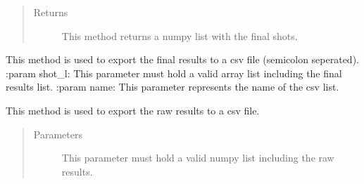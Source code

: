 \documentclass[letterpaper,10pt,english,openany,oneside]{sphinxmanual}
\begin{document}
\begin{fulllineitems}
\begin{fulllineitems}
\begin{quote}
\begin{description}
\item[{Returns}] \leavevmode
This method returns a numpy list with the final shots.

\end{description}\end{quote}

\end{fulllineitems}


\begin{fulllineitems}
\label{\detokenize{SBD:sbd.SBD.SBD.exportFinalResultsToCsv}}
This method is used to export the final results to a csv file (semicolon seperated).
:param shot\_l: This parameter must hold a valid array list including the final results list.
:param name: This parameter represents the name of the csv list.

\end{fulllineitems}


\begin{fulllineitems}
\label{\detokenize{SBD:sbd.SBD.SBD.exportRawResultsAsCsv_New}}
This method is used to export the raw results to a csv file.
\begin{quote}\begin{description}
\item[{Parameters}] \leavevmode
{} \textendash{} This parameter must hold a valid numpy list including the raw results.

\end{description}\end{quote}

\end{fulllineitems}



\end{fulllineitems}
\end{document}
